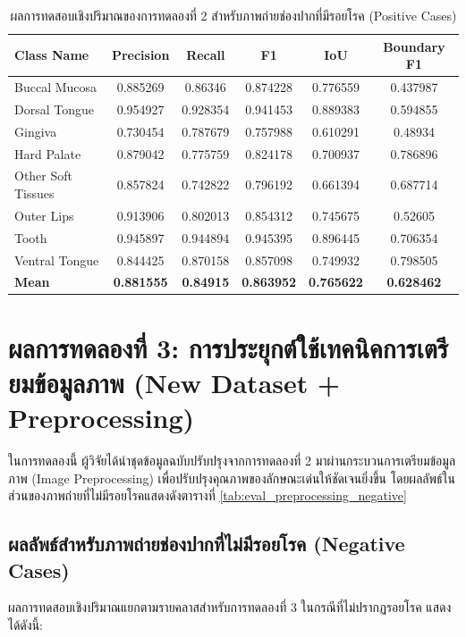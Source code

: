 \begin{table}[H]
\centering
\caption{ผลการทดสอบเชิงปริมาณของการทดลองที่ 2 สำหรับภาพถ่ายช่องปากที่มีรอยโรค (Positive Cases)}
\label{tab:eval_new_dataset_positive}
\begin{tabular}{|l|c|c|c|c|c|}
\hline
\textbf{Class Name} & \textbf{Precision} & \textbf{Recall} & \textbf{F1} & \textbf{IoU} & \textbf{Boundary F1} \\ \hline
Buccal Mucosa & 0.885269 & 0.86346 & 0.874228	& 0.776559 & 0.437987 \\
Dorsal Tongue & 0.954927 & 0.928354 & 0.941453 & 0.889383 & 0.594855 \\
Gingiva & 0.730454 & 0.787679 & 0.757988	& 0.610291 & 0.48934 \\
Hard Palate & 0.879042 & 0.775759 & 0.824178 & 0.700937 & 0.786896 \\
Other Soft Tissues & 0.857824 & 0.742822 & 0.796192 & 0.661394 & 0.687714 \\
Outer Lips & 0.913906 & 0.802013 & 0.854312 & 0.745675 & 0.52605 \\
Tooth & 0.945897 & 0.944894 & 0.945395 & 0.896445 & 0.706354 \\
Ventral Tongue & 0.844425 & 0.870158 & 0.857098 & 0.749932 & 0.798505 \\ \hline
\textbf{Mean} & \textbf{0.881555} & \textbf{0.84915} & \textbf{0.863952} & \textbf{0.765622} & \textbf{0.628462} \\ \hline
\end{tabular}
\end{table}


\section{ผลการทดลองที่ 3: การประยุกต์ใช้เทคนิคการเตรียมข้อมูลภาพ (New Dataset + Preprocessing)}
ในการทดลองนี้ ผู้วิจัยได้นำชุดข้อมูลฉบับปรับปรุงจากการทดลองที่ 2 มาผ่านกระบวนการเตรียมข้อมูลภาพ (Image Preprocessing) เพื่อปรับปรุงคุณภาพของลักษณะเด่นให้ชัดเจนยิ่งขึ้น โดยผลลัพธ์ในส่วนของภาพถ่ายที่ไม่มีรอยโรคแสดงดังตารางที่ \ref{tab:eval_preprocessing_negative}

\subsection{ผลลัพธ์สำหรับภาพถ่ายช่องปากที่ไม่มีรอยโรค (Negative Cases)}
ผลการทดสอบเชิงปริมาณแยกตามรายคลาสสำหรับการทดลองที่ 3 ในกรณีที่ไม่ปรากฏรอยโรค แสดงได้ดังนี้:

